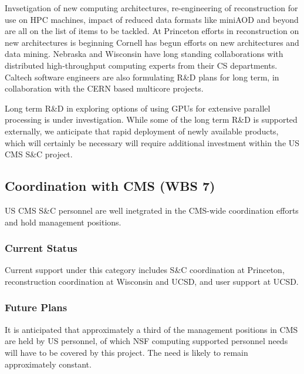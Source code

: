 \documentclass[11pt,a4paper]{article}
\begin{document}
Invsetigation of new computing architectures, re-engineering of
reconstruction for use on HPC machines, impact of reduced data formats
like miniAOD and beyond are all on the list of items to be tackled.
At Princeton efforts in reconstruction on new architectures is
beginning Cornell has begun efforts on new architectures and data
mining.  Nebraska and Wisconsin have long standing collaborations with
distributed high-throughput computing experts from their CS
departments.  Caltech software engineers are also formulating R\&D
plans for long term, in collaboration with the CERN based multicore
projects.

Long term R\&D in exploring options of using GPUs for extensive
parallel processing is under investigation.  While some of the long
term R\&D is supported externally, we anticipate that rapid deployment
of newly available products, which will certainly be necessary will
require additional investment within the US CMS S\&C project.


\subsection{Coordination with CMS (WBS 7)}

US CMS S\&C personnel are well inetgrated in the CMS-wide coordination
efforts and hold management positions.  

\subsubsection{Current Status}

Current support under this category includes S\&C coordination at
Princeton, reconstruction coordination at Wisconsin and UCSD, and user
support at UCSD.  

\subsubsection{Future Plans}

It is anticipated that approximately a third of the management positions
in CMS are held by US personnel, of which NSF computing supported 
personnel needs will have to be covered by this project.  The need
is likely to remain approximately constant.
\end{document}

